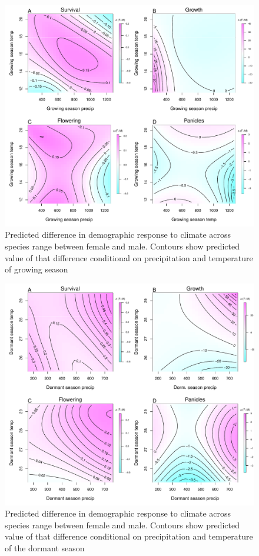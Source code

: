 \documentclass[12pt]{article}\usepackage[]{graphicx}\usepackage[dvipsnames]{xcolor}
\begin{document}
\begin{figure}[H]
	\centering
	\includegraphics[width=0.99\linewidth]{Figures/Vital_rate_growing_3D.pdf}
	\caption{ Predicted difference in demographic response to climate across species range between female and male. Contours show predicted value of that difference conditional on precipitation and temperature of  growing season }
	\label{Sup:vt_3D_grow}
\end{figure}

\begin{figure}[H]
	\centering
	\includegraphics[width=0.99\linewidth]{Figures/Vital_rate_dormant_3D.pdf}
	\caption{ Predicted difference in demographic response to climate across species range between female and male. Contours show predicted value of that difference conditional on precipitation and temperature of the dormant  season }
	\label{Sup:vt_3D_dorm}
\end{figure}
\end{document}

